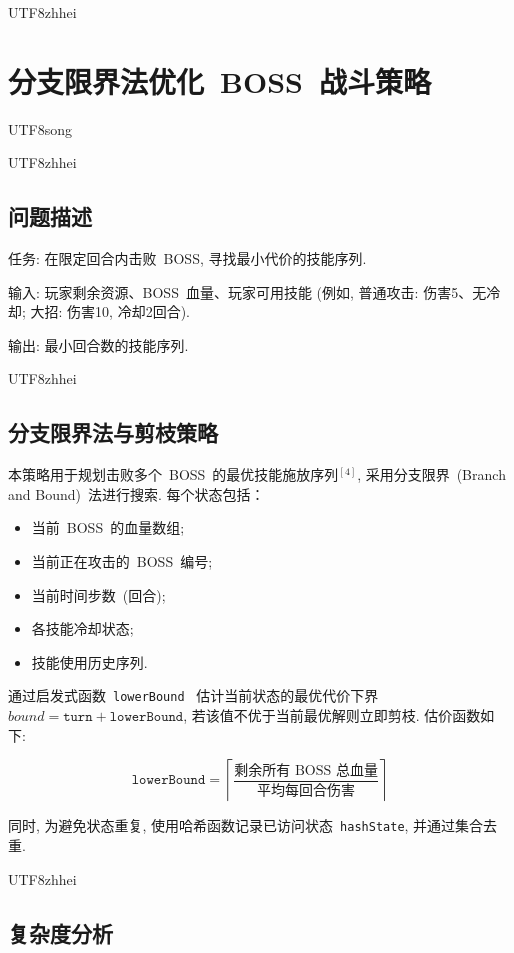 \documentclass[10.5pt,compsoc]{CjC}
\theoremstyle{mystyle}
\begin{document}
\begin{CJK*}{UTF8}{zhhei}
\vskip 1mm
\section{分支限界法优化~BOSS~战斗策略}
\end{CJK*}

\begin{CJK*}{UTF8}{song}
\begin{CJK*}{UTF8}{zhhei}\subsection{问题描述}\end{CJK*}

任务: 在限定回合内击败~BOSS, 寻找最小代价的技能序列.

输入: 玩家剩余资源、BOSS~血量、玩家可用技能 (例如, 普通攻击: 伤害5、无冷却; 
大招: 伤害10, 冷却2回合).

输出: 最小回合数的技能序列.

\begin{CJK*}{UTF8}{zhhei}\subsection{分支限界法与剪枝策略}\end{CJK*}

本策略用于规划击败多个~BOSS~的最优技能施放序列$^{[4]}$,
采用分支限界~(Branch and Bound)~法进行搜索.
每个状态包括：

\begin{itemize}
  \item 当前~BOSS~的血量数组;
  \item 当前正在攻击的~BOSS~编号;
  \item 当前时间步数~(回合);
  \item 各技能冷却状态;
  \item 技能使用历史序列.
\end{itemize}

通过启发式函数~\texttt{lowerBound}~
估计当前状态的最优代价下界~$bound = \texttt{turn} + \texttt{lowerBound}$,
若该值不优于当前最优解则立即剪枝. 
估价函数如下: 

\[
\texttt{lowerBound} = \left\lceil \frac{\text{剩余所有~BOSS~总血量}}{\text{平均每回合伤害}} \right\rceil
\]

同时, 为避免状态重复, 使用哈希函数记录已访问状态~\texttt{hashState},
并通过集合去重.


\begin{CJK*}{UTF8}{zhhei}\subsection{复杂度分析}\end{CJK*}


\end{CJK*}
\end{document}
